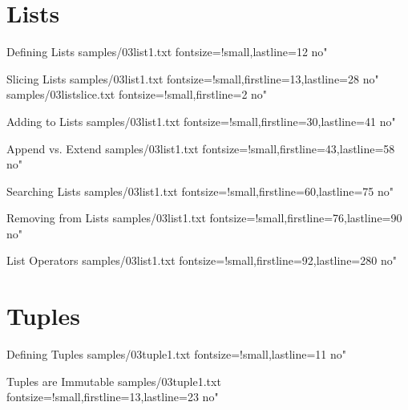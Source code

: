 \documentclass[reference]{pyslides}
\begin{document}
\section{Lists}

\begin{frame}[fragile]{Defining Lists}
 samples/03list1.txt fontsize=!small,lastline=12 no"
\end{frame}

\begin{frame}[fragile]{Slicing Lists}
 samples/03list1.txt fontsize=!small,firstline=13,lastline=28 no"
 samples/03listslice.txt fontsize=!small,firstline=2 no"
\end{frame}

\begin{frame}[fragile]{Adding to Lists}
 samples/03list1.txt fontsize=!small,firstline=30,lastline=41 no"
\end{frame}

\begin{frame}[fragile]{Append vs. Extend}
 samples/03list1.txt fontsize=!small,firstline=43,lastline=58 no"
\end{frame}

\begin{frame}[fragile]{Searching Lists}
 samples/03list1.txt fontsize=!small,firstline=60,lastline=75 no"
\end{frame}

\begin{frame}[fragile]{Removing from Lists}
 samples/03list1.txt fontsize=!small,firstline=76,lastline=90 no"
\end{frame}

\begin{frame}[fragile]{List Operators}
 samples/03list1.txt fontsize=!small,firstline=92,lastline=280 no"
\end{frame}

\section{Tuples}

\begin{frame}[fragile]{Defining Tuples}
 samples/03tuple1.txt fontsize=!small,lastline=11 no"
\end{frame}

\begin{frame}[fragile]{Tuples are Immutable}
 samples/03tuple1.txt fontsize=!small,firstline=13,lastline=23 no"
\end{frame}
\end{document}
